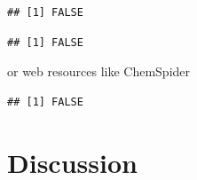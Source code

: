 \begin{knitrout}
\color{fgcolor}\begin{kframe}
\begin{alltt}
\hlstd{(}\hlstd{)}
\end{alltt}


{\ttfamily\noindent\itshape\color{messagecolor}{\#\# Hyphens not at position 15 and 26.}}\begin{verbatim}
## [1] FALSE
\end{verbatim}
\begin{alltt}
\hlstd{(}\hlstd{)}
\end{alltt}


{\ttfamily\noindent\itshape\color{messagecolor}{\#\# Checksum is not correct! 5 vs. 6}}\begin{verbatim}
## [1] FALSE
\end{verbatim}
\end{kframe}
\end{knitrout}

or web resources like ChemSpider
\begin{knitrout}
\color{fgcolor}\begin{kframe}
\begin{alltt}
\hlstd{(}\hlstd{,}
   \hlstd{=} \hlstd{)}
\end{alltt}
\begin{verbatim}
## [1] FALSE
\end{verbatim}
\end{kframe}
\end{knitrout}


\clearpage
\section[Discussion]{Discussion}
